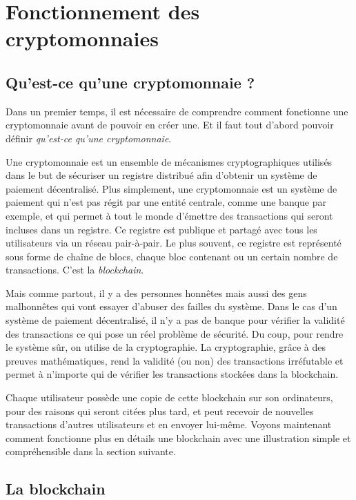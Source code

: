 \chapter{Fonctionnement des cryptomonnaies}
\label{ch:presentation}

\section{Qu'est-ce qu'une cryptomonnaie ?}

Dans un premier temps, il est nécessaire de comprendre comment fonctionne une cryptomonnaie avant de pouvoir en créer une. Et il faut tout d'abord pouvoir définir \emph{qu'est-ce qu'une cryptomonnaie}.

Une cryptomonnaie est un ensemble de mécanismes cryptographiques utilisés dans le but de sécuriser un registre distribué afin d'obtenir un système de paiement décentralisé. Plus simplement, une cryptomonnaie est un système de paiement qui n'est pas régit par une entité centrale, comme une banque par exemple, et qui permet à tout le monde d'émettre des transactions qui seront incluses dans un registre. Ce registre est publique et partagé avec tous les utilisateurs via un réseau pair-à-pair. Le plus souvent, ce registre est représenté sous forme de chaîne de blocs, chaque bloc contenant ou un certain nombre de transactions. C'est la \emph{blockchain}.

Mais comme partout, il y a des personnes honnêtes mais aussi des gens malhonnêtes qui vont essayer d'abuser des failles du système. Dans le cas d'un système de paiement décentralisé, il n'y a pas de banque pour vérifier la validité des transactions ce qui pose un réel problème de sécurité. Du coup, pour rendre le système sûr, on utilise de la cryptographie. La cryptographie, grâce à des preuves mathématiques, rend la validité (ou non) des transactions irréfutable et permet à n'importe qui de vérifier les transactions stockées dans la blockchain.

Chaque utilisateur possède une copie de cette blockchain sur son ordinateurs, pour des raisons qui seront citées plus tard, et peut recevoir de nouvelles transactions d'autres utilisateurs et en envoyer lui-même. Voyons maintenant comment fonctionne plus en détails une blockchain avec une illustration simple et compréhensible dans la section suivante.

\section{La blockchain}

